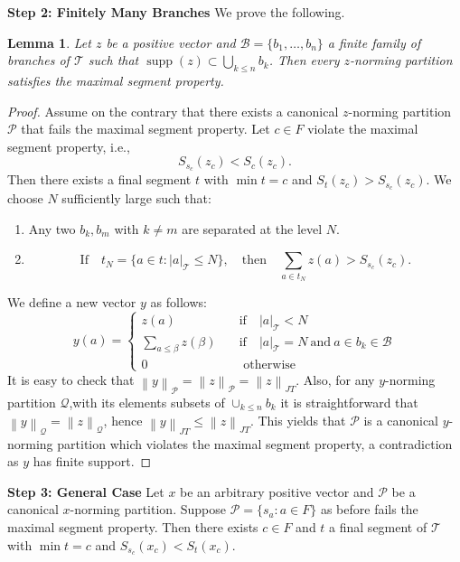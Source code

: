 \documentclass[11pt,a4paper]{amsart}
\newtheorem{lemma}[theorem]{Lemma}
\newcommand{\JT}{JT}
\newcommand{\Tree}{\mathcal{T}}
\newcommand{\norm}[1]{\left\lVert#1\right\rVert}
\newcommand{\supp}{\operatorname{supp}}
\begin{document}
     \textbf{Step 2: Finitely Many Branches} We prove the following.
     
     \begin{lemma} \label{L28} 
       Let $z$ be a positive vector and $\mathcal{B} = \{ b_1, \dots, b_n \} $ a finite family of branches of $\Tree$ such that $\supp(z) \subset \bigcup_{k\le n} b_k$. Then every $z$-norming partition satisfies the maximal segment property.
   \end{lemma}
   \begin{proof}
     Assume on the contrary that there exists a canonical $z$-norming partition $\mathcal{P}$ that fails the maximal segment property. Let $c\in F$ violate the maximal segment property, i.e.,
     \[ S_{s_c} (z_c ) < S_c(z_c). \]
     Then there exists a final segment $t$ with $\min t = c$ and $S_t(z_c) > S_{s_c}(z_c)$. We choose $N$ sufficiently large such that:
      \begin{enumerate}
      \item Any two $b_k, b_m$ with $k \ne m$ are separated at the level $N$.
      \item 
      \[ \text{If} \quad t_N = \{ a\in t: |a|_\Tree \le N\}, \quad \text{then} \quad \sum_{a\in t_N } z(a) > S_{s_c} (z_c). \]
      \end{enumerate}
      We define a new vector $y$ as follows:
      \[
       y(a) = 
       \begin{cases}
        z(a) \quad & \text{if} \quad  |a|_\Tree < N \\
        \sum_{a \le \beta} z(\beta) \quad & \text{if}  \quad  |a|_\Tree = N \: \text{and} \: a\in b_k \in \mathcal{B} \\
        0 \quad & \text{ otherwise}
       \end{cases}
      \]
      It is easy to check that
       $\norm{y}_\mathcal{P} = \norm{z}_\mathcal{P} = \norm{z}_{\JT}$. Also, for any $y$-norming partition $\mathcal{Q}$,with its elements subsets of $ \cup_{k\le n} b_k $ it is straightforward that $\norm{y}_\mathcal{Q} =\norm{z}_\mathcal{Q}$, hence $\norm{y}_{\JT} \le \norm{z}_{\JT}$. This yields that $\mathcal{P}$ is a canonical $y$-norming partition which violates the maximal segment property, a contradiction as $y$ has finite support.
   \end{proof}
   
     
        \textbf{Step 3: General Case}
    Let $x$ be an arbitrary positive vector and $\mathcal{P}$ be a canonical $x$-norming partition.
    Suppose $\mathcal{P}=\{ s_a: a\in F \}$ as before fails the maximal segment property. Then there exists $c\in F$ and $t$ a final segment of $\Tree$ with $\min t=c$ and $S_{s_c}(x_c) < S_t(x_c)$.
    
\end{document}
